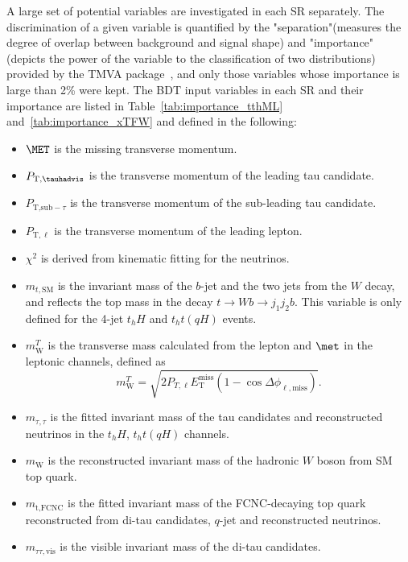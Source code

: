 A large set of potential variables are investigated in each SR separately. The discrimination of a given variable is quantified by the "separation"(measures the degree of overlap between background and signal shape) and "importance"(depicts the power of the variable to the classification of two distributions) provided by the TMVA package~\cite{Hocker:2007ht}, and only those variables whose importance is large than 2\% were kept.
The BDT input variables in each SR and their importance are listed in Table~\ref{tab:importance_tthML} and~\ref{tab:importance_xTFW} and defined in the following:
\begin{itemize}
\item $\MET$ is the missing transverse momentum.
\item $P_{\text{T,\tauhadvis}} $ is the transverse momentum of the leading tau candidate.
\item $P_{\text{T,sub}-\tau}$ is the transverse momentum of the sub-leading tau candidate.
\item $P_{\text{T},\ell}$ is the transverse momentum of the leading lepton.
\item $\chi^2$ is derived from kinematic fitting for the neutrinos.
\item $m_{t,\text{SM}}$ is the invariant mass of the $b$-jet and the two jets from the $W$ decay, and reflects the top mass in the decay $t\to Wb \to j_1j_2b$. This variable is only defined for the 4-jet $t_hH$ and $t_ht(qH)$ events.
\item $m^{T}_{\text{W}}$ is the transverse mass calculated from the lepton and $\met$ in the leptonic channels, defined as
\begin{equation}
m^{T}_{\text{W}} = \sqrt{2 P_{T,\ell} E_{\text{T}}^{\text{miss}} \left(1-\cos\Delta\phi_{\ell,\text{miss}} \right)}.  
\end{equation}
\item $m_{\tau,\tau}$ is the fitted invariant mass of the tau candidates and reconstructed neutrinos in the $t_hH$, $t_ht(qH)$ channels. 
\item $m_{\text{W}}$ is the reconstructed invariant mass of the hadronic $W$ boson from SM top quark.
\item $m_{\text{t},\text{FCNC}}$ is the fitted invariant mass of the FCNC-decaying top quark reconstructed from di-tau candidates, $q$-jet and reconstructed neutrinos.
\item $m_{\tau\tau,\text{vis}}$ is the visible invariant mass of the di-tau candidates. %

\end{itemize}
